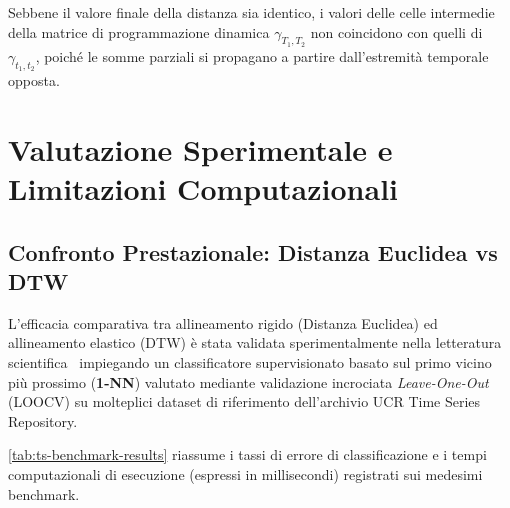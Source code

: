 \begin{remark}
Sebbene il valore finale della distanza sia identico, i valori delle celle intermedie della matrice di programmazione dinamica $\gamma_{T_1, T_2}$ non coincidono con quelli di $\gamma_{t_1, t_2}$, poich\'e le somme parziali si propagano a partire dall'estremit\`a temporale opposta.
\end{remark}

\FloatBarrier
\section{Valutazione Sperimentale e Limitazioni Computazionali}
\label{sec:ts-experimental-evaluation-optimizations}

\FloatBarrier
\subsection{Confronto Prestazionale: Distanza Euclidea vs DTW}
\label{subsec:ts-euclidean-vs-dtw-benchmarks}

L'efficacia comparativa tra allineamento rigido (Distanza Euclidea) ed allineamento elastico (DTW) \`e stata validata sperimentalmente nella letteratura scientifica~\cite{ratanamahatana2010} impiegando un classificatore supervisionato basato sul primo vicino pi\`u prossimo (\textbf{1-NN}) valutato mediante validazione incrociata \textit{Leave-One-Out} (LOOCV) su molteplici dataset di riferimento dell'archivio UCR Time Series Repository.

\autoref{tab:ts-benchmark-results} riassume i tassi di errore di classificazione e i tempi computazionali di esecuzione (espressi in millisecondi) registrati sui medesimi benchmark.

